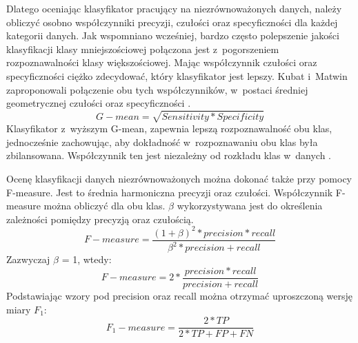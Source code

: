 Dlatego oceniając klasyfikator pracujący na niezrównoważonych danych, należy obliczyć osobno współczynniki precyzji, czułości oraz specyficzności dla każdej kategorii danych. Jak wspomniano wcześniej, bardzo często polepszenie jakości klasyfikacji klasy mniejszościowej połączona jest z~pogorszeniem rozpoznawalności klasy większościowej. Mając współczynnik czułości oraz specyficzności ciężko zdecydować, który klasyfikator jest lepszy. Kubat i~Matwin zaproponowali połączenie obu tych współczynników, w~postaci średniej geometrycznej czułości oraz specyficzności \cite{KubatMatwin}. 
\[G-mean = \sqrt{Sensitivity*Specificity}\]
Klasyfikator z~wyższym G-mean, zapewnia lepszą rozpoznawalność obu klas, jednocześnie zachowując, aby dokładność w~rozpoznawaniu obu klas była zbilansowana. Współczynnik ten jest niezależny od rozkładu klas w~danych \cite{Garcia}. \par
Ocenę klasyfikacji danych niezrównoważonych można dokonać także przy pomocy F-measure. Jest to średnia harmoniczna precyzji oraz czułości. Współczynnik F-measure można obliczyć dla obu klas. $\beta$ wykorzystywana jest do określenia zależności pomiędzy precyzją oraz czułością.
\[F-measure= \frac{(1+\beta)^2*precision*recall}{\beta^2*precision+recall}\]
Zazwyczaj $\beta$ = 1, wtedy:
\[F-measure= 2*\frac{precision*recall}{precision+recall}\]
Podstawiając wzory pod precision oraz recall można otrzymać uproszczoną wersję miary $F_1$:
\[F_1-measure= \frac{2*TP}{2*TP+FP+FN}\]

